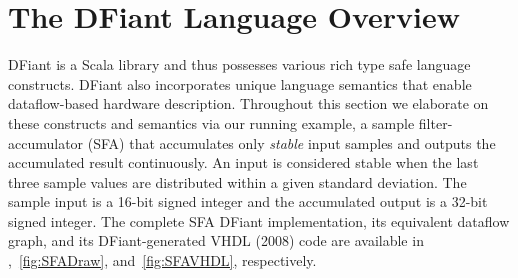 \section{The DFiant Language Overview}
\label{sec:dfiant}
DFiant is a Scala library and thus possesses various rich type safe language constructs. DFiant also incorporates unique language semantics that enable dataflow-based hardware description. Throughout this section we elaborate on these constructs and semantics via our running example, a sample filter-accumulator (SFA) that accumulates only \textit{stable} input samples and outputs the accumulated result continuously. An input is considered stable when the last three sample values are distributed within a given standard deviation. The sample input is a 16-bit signed integer and the accumulated output is a 32-bit signed integer. The complete SFA DFiant implementation, its equivalent dataflow graph, and its DFiant-generated VHDL (2008) code are available in ,~\ref{fig:SFADraw}, and~\ref{fig:SFAVHDL}, respectively.


